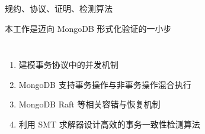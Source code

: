 
\begin{frame}{}

  \begin{center}
    规约、协议、证明、检测算法
  \end{center}
\end{frame}

\begin{frame}{}
  \begin{center}
    本工作是迈向 MongoDB 形式化验证的一小步
  \end{center}


  \vspace{0.20cm}
  \begin{columns}
      \begin{enumerate}[(1)]
        \setlength{\itemsep}{10pt}
        \item 建模事务协议中的并发机制
        \item MongoDB 支持事务操作与非事务操作混合执行
        \item MongoDB Raft 等相关容错与恢复机制
        \item 利用 SMT 求解器设计高效的事务一致性检测算法
      \end{enumerate}
  \end{columns}
\end{frame}
